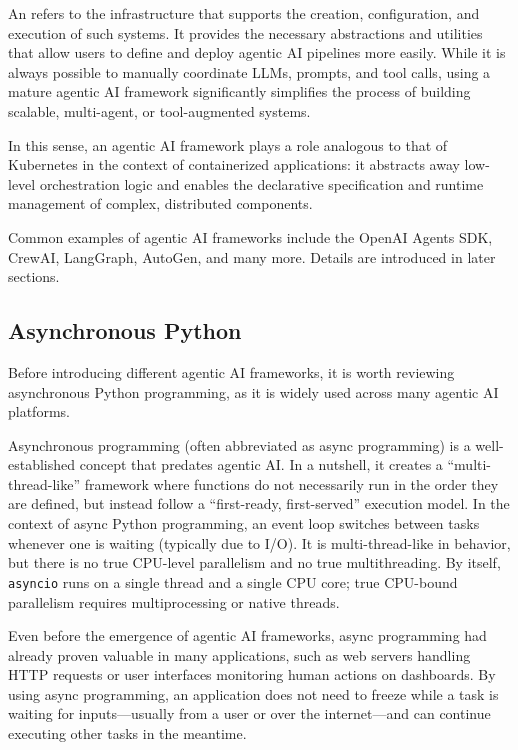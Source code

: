 An  refers to the infrastructure that supports the creation, configuration, and execution of such systems. It provides the necessary abstractions and utilities that allow users to define and deploy agentic AI pipelines more easily. While it is always possible to manually coordinate LLMs, prompts, and tool calls, using a mature agentic AI framework significantly simplifies the process of building scalable, multi-agent, or tool-augmented systems.

In this sense, an agentic AI framework plays a role analogous to that of Kubernetes in the context of containerized applications: it abstracts away low-level orchestration logic and enables the declarative specification and runtime management of complex, distributed components.

Common examples of agentic AI frameworks include the OpenAI Agents SDK, CrewAI, LangGraph, AutoGen, and many more. Details are introduced in later sections.

\subsection{Asynchronous Python}

Before introducing different agentic AI frameworks, it is worth reviewing asynchronous Python programming, as it is widely used across many agentic AI platforms.

Asynchronous programming (often abbreviated as async programming) is a well-established concept that predates agentic AI. In a nutshell, it creates a ``multi-thread-like'' framework where functions do not necessarily run in the order they are defined, but instead follow a ``first-ready, first-served'' execution model. In the context of async Python programming, an event loop switches between tasks whenever one is waiting (typically due to I/O). It is multi-thread-like in behavior, but there is no true CPU-level parallelism and no true multithreading. By itself, \verb|asyncio| runs on a single thread and a single CPU core; true CPU-bound parallelism requires multiprocessing or native threads.

Even before the emergence of agentic AI frameworks, async programming had already proven valuable in many applications, such as web servers handling HTTP requests or user interfaces monitoring human actions on dashboards. By using async programming, an application does not need to freeze while a task is waiting for inputs—usually from a user or over the internet—and can continue executing other tasks in the meantime.

